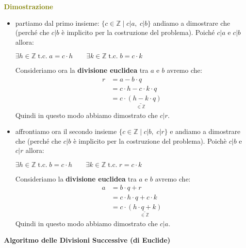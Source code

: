 \begin{boxA}
    \textcolor{olive}{\textbf{Dimostrazione}}
    \begin{itemize}[nosep]
        \item partiamo dal primo insieme: $\{c \in \mathbb{Z} \; \vert \; c | a, \; c | b \}$ andiamo a dimostrare che  (perché che $c|b$ è implicito per la costruzione del problema). Poiché $c|a$ e $c|b$ allora:
        
        {\centering
            $\exists h \in \mathbb{Z} \; \text{t.c.} \; a = c \cdot h \qquad \exists k \in \mathbb{Z} \; \text{t.c.} \; b = c \cdot k$
        \par}

        Consideriamo ora la \textbf{divisione euclidea} tra $a$ e $b$ avremo che:
        \begin{align*}
            r &= a - b \cdot q \\
            &= c \cdot h - c \cdot k \cdot q \\
            & = \underset{\in \mathbb{Z}}{\underline{c \cdot (h - k \cdot q)}}
        \end{align*}
        Quindi in questo modo abbiamo dimostrato che $c|r$.
    \end{itemize}
\end{boxA}

\begin{boxA}
    \begin{itemize}[nosep]
        \item affrontiamo ora il secondo insieme $\{c \in \mathbb{Z} \; | \; c | b, \; c | r \}$ e andiamo a dimostrare che  (perché che $c|b$ è implicito per la costruzione del problema). Poichè $c|b$ e $c|r$ allora:

        {\centering
            $\exists h \in \mathbb{Z} \; \text{t.c.} \; b = c \cdot h \qquad \exists k \in \mathbb{Z} \; \text{t.c.} \; r = c \cdot k$
        \par}

        Consideriamo la \textbf{divisione euclidea} tra $a$ e $b$ avremo che:
        \begin{align*}
            a &= b \cdot q + r \\
            &= c \cdot h \cdot q + c \cdot k \\
            &= c \cdot \underset{\in \mathbb{Z}}{\underline{(h \cdot q + k)}}
        \end{align*} 
        Quindi in questo modo abbiamo dimostrato che $c|a$.
    \end{itemize}
\end{boxA}

\textbf{Algoritmo delle Divisioni Successive (di Euclide)}
